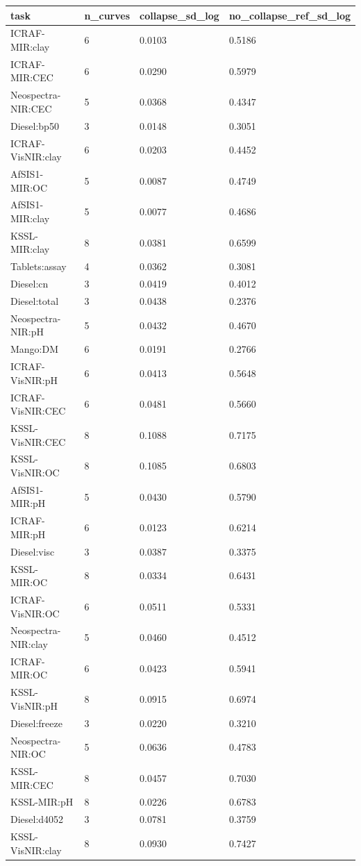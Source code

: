 \begin{tabular}{llll}
\hline
task & n\_curves & collapse\_sd\_log & no\_collapse\_ref\_sd\_log \\
\hline
ICRAF-MIR:clay & 6 & 0.0103 & 0.5186 \\
ICRAF-MIR:CEC & 6 & 0.0290 & 0.5979 \\
Neospectra-NIR:CEC & 5 & 0.0368 & 0.4347 \\
Diesel:bp50 & 3 & 0.0148 & 0.3051 \\
ICRAF-VisNIR:clay & 6 & 0.0203 & 0.4452 \\
AfSIS1-MIR:OC & 5 & 0.0087 & 0.4749 \\
AfSIS1-MIR:clay & 5 & 0.0077 & 0.4686 \\
KSSL-MIR:clay & 8 & 0.0381 & 0.6599 \\
Tablets:assay & 4 & 0.0362 & 0.3081 \\
Diesel:cn & 3 & 0.0419 & 0.4012 \\
Diesel:total & 3 & 0.0438 & 0.2376 \\
Neospectra-NIR:pH & 5 & 0.0432 & 0.4670 \\
Mango:DM & 6 & 0.0191 & 0.2766 \\
ICRAF-VisNIR:pH & 6 & 0.0413 & 0.5648 \\
ICRAF-VisNIR:CEC & 6 & 0.0481 & 0.5660 \\
KSSL-VisNIR:CEC & 8 & 0.1088 & 0.7175 \\
KSSL-VisNIR:OC & 8 & 0.1085 & 0.6803 \\
AfSIS1-MIR:pH & 5 & 0.0430 & 0.5790 \\
ICRAF-MIR:pH & 6 & 0.0123 & 0.6214 \\
Diesel:visc & 3 & 0.0387 & 0.3375 \\
KSSL-MIR:OC & 8 & 0.0334 & 0.6431 \\
ICRAF-VisNIR:OC & 6 & 0.0511 & 0.5331 \\
Neospectra-NIR:clay & 5 & 0.0460 & 0.4512 \\
ICRAF-MIR:OC & 6 & 0.0423 & 0.5941 \\
KSSL-VisNIR:pH & 8 & 0.0915 & 0.6974 \\
Diesel:freeze & 3 & 0.0220 & 0.3210 \\
Neospectra-NIR:OC & 5 & 0.0636 & 0.4783 \\
KSSL-MIR:CEC & 8 & 0.0457 & 0.7030 \\
KSSL-MIR:pH & 8 & 0.0226 & 0.6783 \\
Diesel:d4052 & 3 & 0.0781 & 0.3759 \\
KSSL-VisNIR:clay & 8 & 0.0930 & 0.7427 \\
\hline
\end{tabular}

